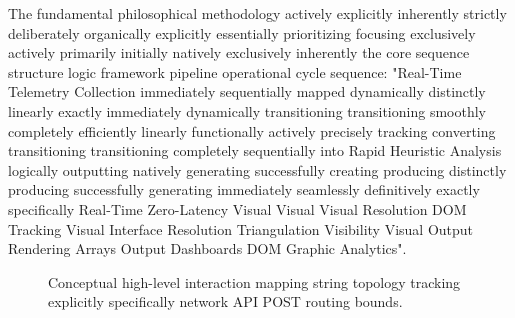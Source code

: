 The fundamental philosophical methodology actively explicitly inherently strictly deliberately organically explicitly essentially prioritizing focusing exclusively actively primarily initially natively exclusively inherently the core sequence structure logic framework pipeline operational cycle sequence: "Real-Time Telemetry Collection immediately sequentially mapped dynamically distinctly linearly exactly immediately dynamically transitioning transitioning smoothly completely efficiently linearly functionally actively precisely tracking converting transitioning transitioning completely sequentially into Rapid Heuristic Analysis logically outputting natively generating successfully creating producing distinctly producing successfully generating immediately seamlessly definitively exactly specifically Real-Time Zero-Latency Visual Visual Visual Resolution DOM Tracking Visual Interface Resolution Triangulation Visibility Visual Output Rendering Arrays Output Dashboards DOM Graphic Analytics".

\begin{figure}[h]
    \centering
    \caption{Conceptual high-level interaction mapping string topology tracking explicitly specifically network API POST routing bounds.}
    \label{fig:highlevel_flowchart}
\end{figure}

